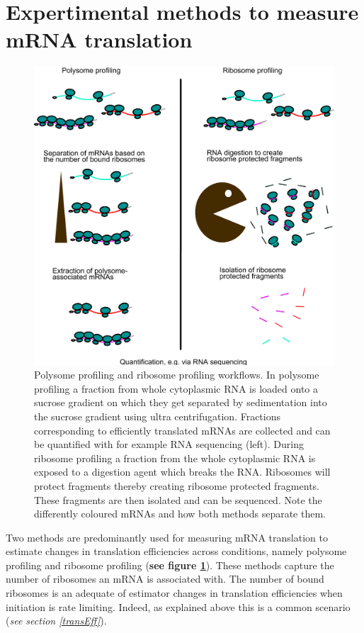 \documentclass[
  12pt,
  openany]{book}
\begin{document}
\clearpage
\section{Expertimental methods to measure mRNA translation} \label{exptMethod}
\begin{figure}
    \includegraphics{./figures/polyRibo.pdf}
  \caption{Polysome profiling and ribosome profiling workflows. In polysome profiling a fraction from whole cytoplasmic RNA is loaded onto a sucrose gradient on which they get separated by sedimentation into the sucrose gradient using ultra centrifugation. Fractions corresponding to efficiently translated mRNAs are collected and can be quantified with for example RNA sequencing (left). During ribosome profiling a fraction from the whole cytoplasmic RNA is exposed to a digestion agent which breaks the RNA. Ribosomes will protect fragments thereby creating ribosome protected fragments. These fragments are then isolated and can be sequenced. Note the differently coloured mRNAs and how both methods separate them. \label{fig:polyRibo}}
\end{figure}

Two methods are predominantly used for measuring mRNA translation to estimate changes in translation efficiencies across conditions, namely polysome profiling and ribosome profiling (\textbf{see figure \ref{fig:polyRibo}}). These methods capture the number of ribosomes an mRNA is associated with. The number of bound ribosomes is an adequate of estimator changes in translation efficiencies when initiation is rate limiting. Indeed, as explained above this is a common scenario (\emph{see section \ref{transEff}}).
\end{document}
